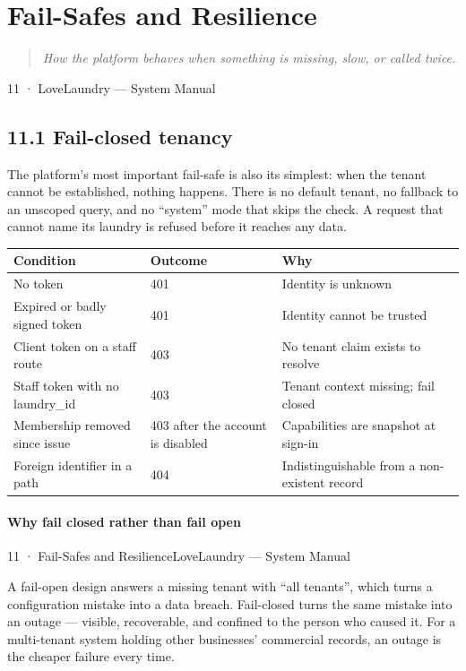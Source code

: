 \documentclass[11pt,a4paper,oneside]{book}
\begin{document}
\chapter{Fail-Safes and Resilience}
\begin{quote}\itshape How the platform behaves when something is missing, slow, or called twice.\end{quote}
11 · LoveLaundry — System Manual

\section{11.1 Fail-closed tenancy}
The platform's most important fail-safe is also its simplest: when the tenant cannot be established, nothing happens. There is no default tenant, no fallback to an unscoped query, and no “system” mode that skips the check. A request that cannot name its laundry is refused before it reaches any data.

\begin{center}\small
\begin{tabularx}{\linewidth}{|X|X|X|}
\hline
\rowcolor{lightgrey}
\textbf{Condition} & \textbf{Outcome} & \textbf{Why} \\ \hline
No token & 401 & Identity is unknown \\ \hline
Expired or badly signed token & 401 & Identity cannot be trusted \\ \hline
Client token on a staff route & 403 & No tenant claim exists to resolve \\ \hline
Staff token with no laundry\_id & 403 & Tenant context missing; fail closed \\ \hline
Membership removed since issue & 403 after the account is disabled & Capabilities are snapshot at sign-in \\ \hline
Foreign identifier in a path & 404 & Indistinguishable from a non-existent record \\ \hline
\end{tabularx}
\end{center}
\subsubsection*{Why fail closed rather than fail open}
11 · Fail-Safes and ResilienceLoveLaundry — System Manual

A fail-open design answers a missing tenant with “all tenants”, which turns a configuration mistake into a data breach. Fail-closed turns the same mistake into an outage — visible, recoverable, and confined to the person who caused it. For a multi-tenant system holding other businesses' commercial records, an outage is the cheaper failure every time.
\end{document}

